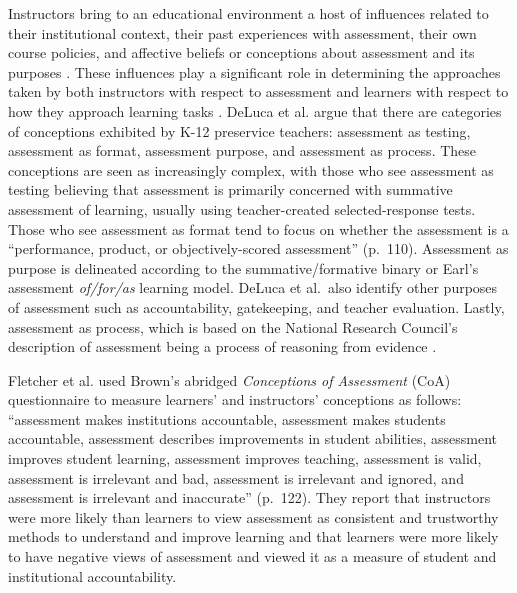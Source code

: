 \documentclass[
]{book}
\begin{document}
Instructors bring to an educational environment a host of influences related to their institutional context, their past experiences with assessment, their own course policies, and affective beliefs or conceptions about assessment and its purposes \citep{biggsTheoryPracticeCognitive1993, brownQueenslandTeachersConceptions2011}. These influences play a significant role in determining the approaches taken by both instructors with respect to assessment and learners with respect to how they approach learning tasks \citep{brownQueenslandTeachersConceptions2011}. DeLuca et al. \citeyearpar{delucaEstablishingFoundationValid2013} argue that there are categories of conceptions exhibited by K-12 preservice teachers: assessment as testing, assessment as format, assessment purpose, and assessment as process. These conceptions are seen as increasingly complex, with those who see assessment as testing believing that assessment is primarily concerned with summative assessment of learning, usually using teacher-created selected-response tests. Those who see assessment as format tend to focus on whether the assessment is a ``performance, product, or objectively-scored assessment'' (p.~110). Assessment as purpose is delineated according to the summative/formative binary or Earl's \citeyearpar{earlAssessmentLearningUsing2013} assessment \emph{of/for/as} learning model. DeLuca et al.~also identify other purposes of assessment such as accountability, gatekeeping, and teacher evaluation. Lastly, assessment as process, which is based on the National Research Council's description of assessment being a process of reasoning from evidence \citeyearpar{pellegrinoKnowingWhatStudents2001}.

Fletcher et al. \citeyearpar{fletcherFacultyStudentsConceptions2012} used Brown's \citeyearpar{brownTeachersConceptionsAssessment2017} abridged \emph{Conceptions of Assessment} (CoA) questionnaire to measure learners' and instructors' conceptions as follows: ``assessment makes institutions accountable, assessment makes students accountable, assessment describes improvements in student abilities, assessment improves student learning, assessment improves teaching, assessment is valid, assessment is irrelevant and bad, assessment is irrelevant and ignored, and assessment is irrelevant and inaccurate'' (p.~122). They report that instructors were more likely than learners to view assessment as consistent and trustworthy methods to understand and improve learning and that learners were more likely to have negative views of assessment and viewed it as a measure of student and institutional accountability.
\end{document}
